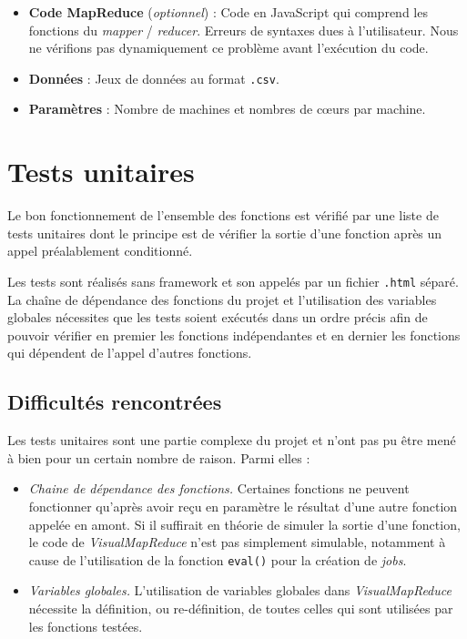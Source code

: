 \vspace{10pt}
\begin{itemize}
\item \textbf{Code MapReduce} (\emph{optionnel}) : Code en JavaScript qui comprend les fonctions du {\it mapper} / {\it reducer}. Erreurs de syntaxes dues à l'utilisateur. Nous ne vérifions pas dynamiquement ce problème avant l'exécution du code.

\item \textbf{Données} : Jeux de données au format \texttt{.csv}.

\item \textbf{Paramètres} : Nombre de machines et nombres de cœurs par machine.
\end{itemize}

\section{Tests unitaires}

Le bon fonctionnement de l'ensemble des fonctions est vérifié par une liste de tests unitaires dont le principe est de vérifier la sortie d'une fonction après un appel préalablement conditionné.

Les tests sont réalisés sans framework et son appelés par un fichier {\tt .html} séparé. La chaîne de dépendance des fonctions du projet et l'utilisation des variables globales nécessites que les tests soient exécutés dans un ordre précis afin de pouvoir vérifier en premier les fonctions indépendantes et en dernier les fonctions qui dépendent de l'appel d'autres fonctions.

\subsection{Difficultés rencontrées}

Les tests unitaires sont une partie complexe du projet et n'ont pas pu être mené à bien pour un certain nombre de raison. Parmi elles :
\begin{itemize}
	\item {\it Chaine de dépendance des fonctions.} Certaines fonctions ne peuvent fonctionner qu'après avoir reçu en paramètre le résultat d'une autre fonction appelée en amont. Si il suffirait en théorie de simuler la sortie d'une fonction, le code de {\it VisualMapReduce} n'est pas simplement simulable, notamment à cause de l'utilisation de la fonction {\tt eval()} pour la création de {\it jobs}.
	\item {\it Variables globales.} L'utilisation de variables globales dans {\it VisualMapReduce} nécessite la définition, ou re-définition, de toutes celles qui sont utilisées par les fonctions testées.
\end{itemize}

